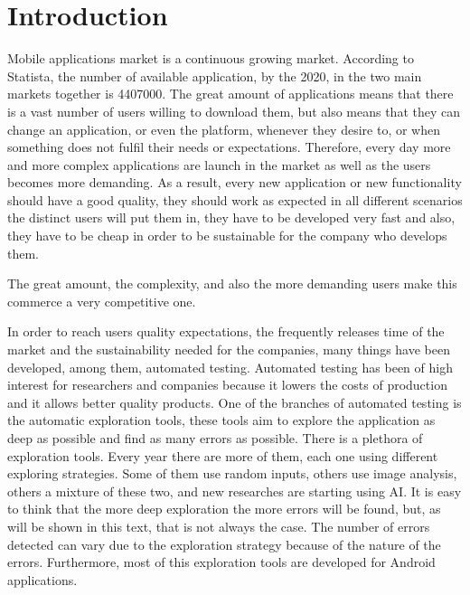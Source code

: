 
\chapter{Introduction} %

\label{Chapter1} %

Mobile applications market is a continuous growing market. According to Statista, the number of available application, by the 2020, in the two main markets together is 4407000. The great amount of applications means that there is a vast number of users willing to download them, but also means that they can change an application, or even the platform, whenever they desire to, or when something does not fulfil their needs or expectations. Therefore, every day more and more complex applications are launch in the market as well as the users becomes more demanding. As a result, every new application or new functionality should have a good quality, they should work as expected in all different scenarios the distinct users will put them in, they have to be developed very fast and also, they have to be cheap in order to be sustainable for the company who develops them. 

The great amount, the complexity, and also the more demanding users make this commerce a very competitive one.

In order to reach users quality expectations, the frequently releases time of the market and the sustainability needed for the companies, many things have been developed, among them, automated testing. Automated testing has been of high interest for researchers and companies because it lowers the costs of production and it allows better quality products. One of the branches of automated testing is the automatic exploration tools, these tools aim to explore the application as deep as possible and find as many errors as possible. There is a plethora of exploration tools. Every year there are more of them, each one using different exploring strategies. Some of them use random inputs, others use image analysis, others a mixture of these two, and new researches are starting using AI. It is easy to think that the more deep exploration the more errors will be found, but, as will be shown in this text, that is not always the case. The number of errors detected can vary due to the exploration strategy because of the nature of the errors. Furthermore, most of this exploration tools are developed for Android applications.

